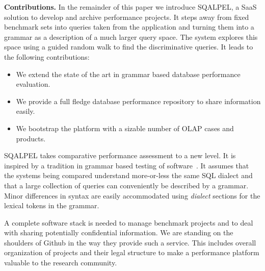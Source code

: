 \documentclass{cidr-2019}
\begin{document}
{\bf Contributions.} In the remainder of this paper we introduce {\sc SQALPEL}, a SaaS solution to develop and archive performance projects. 
It steps away from fixed benchmark sets into queries taken from the application
and turning them into a grammar as a description of a much larger query
space.
The system explores this space using a guided random walk to find the discriminative queries. It leads to the following contributions:

\begin{itemize}
	\item We extend the state of the art in grammar based database performance evaluation.
	\item We provide a full fledge database performance repository to share information easily.
	\item We bootstrap the platform with a sizable number of OLAP cases and products.
\end{itemize}

{\sc SQALPEL} takes comparative performance assessment to a new
level. It is inspired by a tradition in grammar based testing of
software~\cite{10.1007/11754008_2}.  It assumes that the systems being
compared understand more-or-less the same SQL dialect and that a large
collection of queries can conveniently be described by a
grammar. Minor differences in syntax are easily accommodated using
\emph{dialect} sections for the lexical tokens in the grammar.

A complete software stack is needed to manage benchmark projects and to
deal with sharing potentially confidential information.
We are standing on the shoulders of Github in the way they provide such a service. 
This includes overall organization of projects and their legal structure 
to make a performance platform valuable to the research community.

\end{document}
